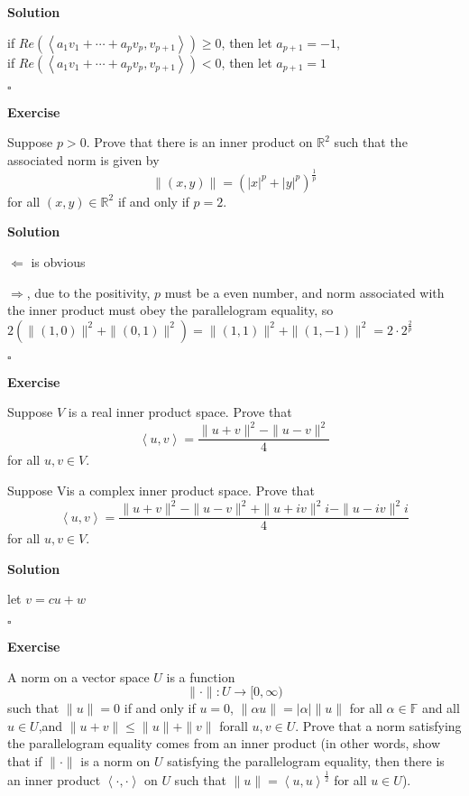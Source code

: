 \documentclass{article}
\newenvironment{exercise}{%
{\textbf{Exercise\\}
    }
}{
}
\newenvironment{solution}{%
{
    \textbf{Solution\\}
    }
}{
  \hfill $\square$ 
  \par\bigskip 
}
\newcommand{\RR}{\mathbb{R}}
\newcommand{\FF}{\mathbb{F}}
\begin{document}
\begin{CJK}{UTF8}{gkai}
\begin{solution}
    if $Re(\left<a_1v_1 + \cdots+a_{p}v_{p},v_{p + 1}\right>) \geq 0$, then let $a_{p + 1} = -1$,\\
    
    if $Re(\left<a_1v_1 + \cdots+a_{p}v_{p},v_{p + 1}\right>) < 0$, then let $a_{p + 1} = 1$
\end{solution}

\begin{exercise}
    Suppose $p > 0$. Prove that there is an inner product on $\RR^2$ such that the associated norm is given by
    \[\|(x, y)\| = (|x|^p + |y|^p)^\frac{1}{p}\]
    for all $(x,y) \in \RR^2$ if and only if $p = 2$.
\end{exercise}

\begin{solution}
    $\Leftarrow$ is obvious

    $\Rightarrow$, due to the positivity, $p$ must be a even number, and norm associated with the inner product must obey the parallelogram equality, so $2(\|(1,0)\|^2 + \|(0,1)\|^2) = \|(1,1)\|^2 + \|(1,-1)\|^2 = 2 \cdot 2^\frac{2}{p}$
\end{solution}

\begin{exercise}
    Suppose $V$ is a real inner product space. Prove that
    \[\left<u, v\right> = \dfrac{\|u+v\|^2 -\|u-v\|^2}{4}\]
    for all $u,v \in V$.

    Suppose Vis a complex inner product space. Prove that
    \[\left<u, v\right> = \dfrac{\|u+v\|^2 -\|u-v\|^2 +\|u+iv\|^2i -\|u-iv\|^2i}{4}\]
    for all $u,v \in V$.
\end{exercise}

\begin{solution}
    let $v = cu + w$
\end{solution}

\begin{exercise}
    A norm on a vector space $U$ is a function
    \[\|\cdot\|: U \rightarrow [0,\infty)\]
    such that $\|u\| = 0$ if and only if $u = 0$, $\|\alpha u\| = |\alpha |\|u\|$ for all $\alpha \in \FF$ and all $u \in U$,and $\|u+v\| \leq \|u\|+\|v\|$ forall $u,v \in U$. Prove that a norm satisfying the parallelogram equality comes from an inner product (in other words, show that if $\|\cdot\|$ is a norm on $U$ satisfying the parallelogram equality, then there is an inner product $\left<\cdot,\cdot\right>$ on $U$ such that $\|u\| = \left<u,u\right>^\frac{1}{2}$ for all $u \in U$).
\end{exercise}


\end{CJK}
\end{document}
